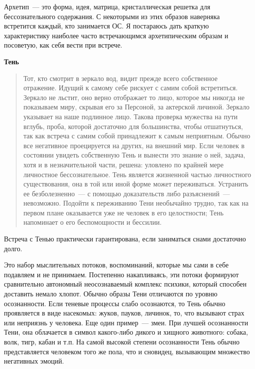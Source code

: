 \documentclass[a4paper,14pt,oneside]{memoir}
\begin{document}
Архетип~--- это форма, идея, матрица, кристаллическая решетка для бессознательного содержания. С некоторыми из этих образов наверняка встретится каждый, кто занимается ОС. Я постараюсь дать краткую характеристику наиболее часто встречающимся архетипическим образам и посоветую, как себя вести при встрече.

\begin{center}
\bfseries{Тень} 
\end{center}


\begin{quotation}
Тот, кто смотрит в зеркало вод, видит прежде всего собственное отражение. Идущий к самому себе рискует с самим собой встретиться. Зеркало не льстит, оно верно отображает то лицо, которое мы никогда не показываем миру, скрывая его за Персоной, за актерской личиной. Зеркало указывает на наше подлинное лицо. Такова проверка мужества на пути вглубь, проба, которой достаточно для большинства, чтобы отшатнуться, так как встреча с самим собой принадлежит к самым неприятным. Обычно все негативное проецируется на других, на внешний мир. Если человек в состоянии увидеть собственную Тень и вынести это знание о ней, задача, хотя и в незначительной части, решена: уловлено по крайней мере личностное бессознательное. Тень является жизненной частью личностного существования, она в той или иной форме может переживаться. Устранить ее безболезненно~--- с помощью доказательств либо разъяснений~--- невозможно. Подойти к переживанию Тени необычайно трудно, так как на первом плане оказывается уже не человек в его целостности; Тень напоминает о его беспомощности и бессилии. 
\end{quotation}


Встреча с Тенью практически гарантирована, если заниматься снами достаточно долго.

Это набор мыслительных потоков, воспоминаний, которые мы сами в себе подавляем и не принимаем. Постепенно накапливаясь, эти потоки формируют сравнительно автономный неосознаваемый комплекс психики, который способен доставить немало хлопот. Обычно образы Тени отличаются по уровню осознанности. Если теневые процессы слабо осознаются, то Тень обычно проявляется в виде насекомых: жуков, пауков, личинок, то, что вызывают страх или неприязнь у человека. Еще один пример~--- змеи. При лучшей осознанности Тени, она облачается в символ какого-либо дикого и хищного животного: собака, волк, тигр, кабан и т.п. На самой высокой степени осознанности Тень обычно представляется человеком того же пола, что и сновидец, вызывающим множество негативных эмоций.
\end{document}
